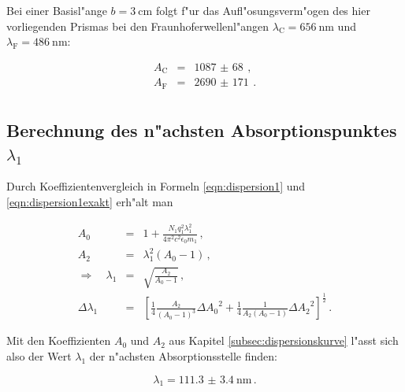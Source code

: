		\clearpage

		Bei einer Basisl"ange $b = \SI{3}{\centi \meter}$ folgt f"ur das Aufl"osungsverm"ogen des hier vorliegenden Prismas bei den Fraunhoferwellenl"angen $\lambda_\mathrm{C} = \SI{656}{\nano \meter}$ und $\lambda_\mathrm{F} = \SI{486}{\nano \meter}$:

		\begin{eqnarray*}
			A_\mathrm{C} & = & \SI{1087(68)}{} \,, \\
			A_\mathrm{F} & = & \SI{2690(171)}{} \,. \\
		\end{eqnarray*}

	\subsection{Berechnung des n"achsten Absorptionspunktes $\lambda_\mathrm{1}$}
	\label{subsec:absorptionspunkt}
		Durch Koeffizientenvergleich in Formeln \eqref{eqn:dispersion1} und \eqref{eqn:dispersion1exakt} erh"alt man

		\begin{eqnarray*}
			A_0 & = & 1 + \frac{N_1 q_1^2 \lambda_1^2}{4 \pi^2 c^2 \epsilon_0 m_1} \,, \\
			A_2 & = & \lambda_1^2 (A_0 - 1) \,, \\
			\Rightarrow \quad \lambda_1 & = & \sqrt{\frac{A_2}{A_0 - 1}} \,, \\
			\Delta \lambda_1 & = & \left[\frac{1}{4}\frac{A_2}{(A_0 - 1)^3} \Delta {A_0}^2 + \frac{1}{4}\frac{1}{A_2 (A_0 - 1)} \Delta {A_2}^2\right]^\frac{1}{2} \,.
		\end{eqnarray*}

		Mit den Koeffizienten $A_0$ und $A_2$ aus Kapitel \ref{subsec:dispersionskurve} l"asst sich also der Wert $\lambda_1$ der n"achsten Absorptionsstelle finden:

		\begin{equation*}
			\lambda_1 = \SI{111.3(34)}{\nano \meter} \,.
		\end{equation*}